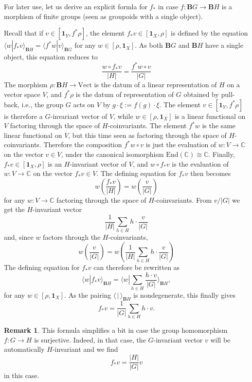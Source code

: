 \documentclass[12pt]{scrartcl}
\theoremstyle{definition}
\newtheorem{remark}[definition]{Remark}
\numberwithin{equation}{section}
\numberwithin{definition}{section}
\numberwithin{figure}{section}
\begin{document}
For  later use, let us derive an explicit formla for $f_*$ in case $f\colon \mathbf{B}G\to \mathbf{B}H$ is a morphism of finite groups (seen as groupoids with a single object).

 Recall that  if $v\in [\mathbf{1}_Y,f^*\rho]$, the element $f_*v\in [\mathbf{1}_X,\rho]$ is defined 
 by the equation $
\langle w| f_*v\rangle_{\mathbf{B}H} = \langle f^*w| v\rangle_{\mathbf{B}G}$
for any $w\in [\rho,\mathbf{1}_X]$. As both $\mathbf{B}G$ and $\mathbf{B}H$ have a single object, this equation reduces to
\[
\frac{w\circ f_*v}{|H|}=\frac{f^*w\circ v}{|G|}
\] 
The morphism $\rho\colon \mathbf{B}H\to \mathrm{Vect}$ is the datum of a linear representation of $H$ on a vector space $V$, and $f^*\rho$ is the datum of representation of $G$ obtained by pull-back, i.e., the group $G$ acts on $V$ by $g\cdot \xi := f(g)\cdot \xi$. The element $v\in [\mathbf{1}_Y,f^*\rho]$ is therefore a $G$-invariant vector of $V$, while $w\in [\rho,\mathbf{1}_X]$ is a linear functional on $V$ factoring through the space of $H$-coinvariants. The element $f^*w$ is the same linear functional on $V$, but this time seen as factoring through the space of $H$-coinvariants. Therefore the composition $f^*w\circ v$ is just the evaluation of $w\colon V\to \mathbb{C}$ on the vector $v\in V$, under the canonical isomorphism $\mathrm{End}(\mathbb{C})\cong \mathbb{C}$. Finally, $f_*v\in  [\mathbf{1}_X,\rho]$ is an $H$-invariant vector of $V$, and $w\circ f_*v$ is the evaluation of $w\colon V\to \mathbb{C}$ on the vector $f_*v\in V$. The defining equation for $f_*v$ then becomes
\[
w\left(\frac{f_*v}{|H|}\right)=w\left(\frac{v}{|G|}\right)
\] 
for any $w\colon V\to \mathbb{C}$ factoring through the space of $H$-coinvariants.
From $v/|G|$ we get the $H$-invariant vector 
\[
\frac{1}{|H|}\sum_{h\in H}h\cdot \frac{v}{|G|}
\]
and, since $w$ factors through the $H$-coinvariants,
\[
w\left(\frac{v}{|G|}\right)=w\left(\frac{1}{|H|}\sum_{h\in H}h\cdot \frac{v}{|G|}\right)
\]
The defining equation for $f_*v$ can therefore be rewritten as
\[
\langle w| f_*v\rangle_{\mathbf{B}H}=\langle w| \sum_{h\in H}\frac{h\cdot v}{|G|}\rangle_{\mathbf{B}H},
\]
for any $w\in [\rho,\mathbf{1}_X]$. As the pairing $\langle \,| \,\rangle_{\mathbf{B}H}$ is nondegenerate, this finally gives
\[
f_*v=\frac{1}{|G|}\sum_{h\in H} h\cdot v.
\] 
\begin{remark}
This formula simplifies a bit in case the group homomorphism $f\colon G\to H$ is surjective. Indeed, in that case, the $G$-invariant vector $v$ will be automatically $H$-invariant and we find
\[
f_*v=\frac{|H|}{|G|} v
\]
in this case.
\end{remark}
\end{document}
